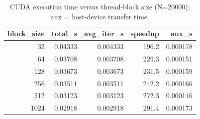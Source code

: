 \begin{table}
\caption{CUDA execution time versus thread-block size (N=20000); aux = host-device transfer time.}
\label{tab:cudablock}
\begin{tabular}{rrrrr}
\toprule
block\_size & total\_s & avg\_iter\_s & speedup & aux\_s \\
\midrule
32 & 0.04333 & 0.004333 & 196.2 & 0.000178 \\
64 & 0.03708 & 0.003708 & 229.3 & 0.000151 \\
128 & 0.03673 & 0.003673 & 231.5 & 0.000159 \\
256 & 0.03511 & 0.003511 & 242.2 & 0.000166 \\
512 & 0.03123 & 0.003123 & 272.3 & 0.000146 \\
1024 & 0.02918 & 0.002918 & 291.4 & 0.000173 \\
\bottomrule
\end{tabular}
\end{table}
